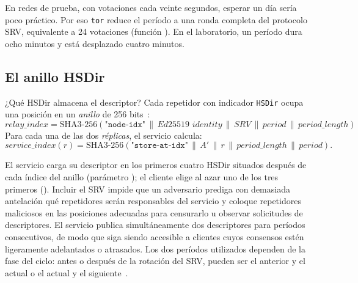 En redes de prueba, con votaciones cada veinte segundos, esperar un día sería poco práctico. Por eso \texttt{tor} reduce el período a una ronda completa del protocolo SRV, equivalente a 24 votaciones (función ). En el laboratorio, un período dura ocho minutos y está desplazado cuatro minutos.

\subsection{El anillo HSDir}

¿Qué HSDir almacena el descriptor? Cada repetidor con indicador \texttt{HSDir} ocupa una posición en un \emph{anillo} de 256 bits~:
\[
\mathit{relay\_index} = \mathrm{SHA3\text{-}256}(\texttt{"node-idx"} \,\|\, \textit{Ed25519 identity} \,\|\, \mathit{SRV} \,\|\, \mathit{period} \,\|\, \mathit{period\_length})
\]
Para cada una de las dos \emph{réplicas}, el servicio calcula:
\[
\mathit{service\_index}(r) = \mathrm{SHA3\text{-}256}(\texttt{"store-at-idx"} \,\|\, A' \,\|\, r \,\|\, \mathit{period\_length} \,\|\, \mathit{period}).
\]

El servicio carga su descriptor en los primeros cuatro HSDir situados después de cada índice del anillo (parámetro ); el cliente elige al azar uno de los tres primeros (). Incluir el SRV impide que un adversario prediga con demasiada antelación qué repetidores serán responsables del servicio y coloque repetidores maliciosos en las posiciones adecuadas para censurarlo u observar solicitudes de descriptores. El servicio publica simultáneamente dos descriptores para períodos consecutivos, de modo que siga siendo accesible a clientes cuyos consensos estén ligeramente adelantados o atrasados. Los dos períodos utilizados dependen de la fase del ciclo: antes o después de la rotación del SRV, pueden ser el anterior y el actual o el actual y el siguiente~.

